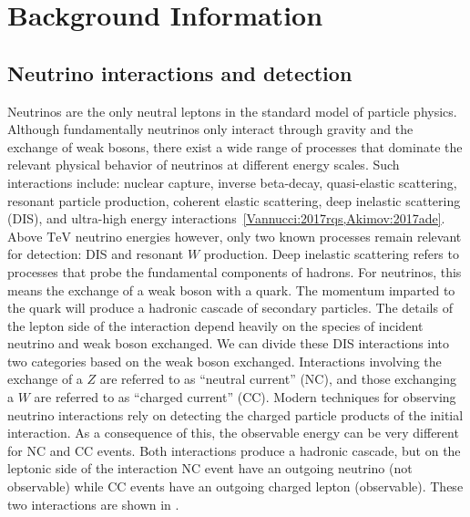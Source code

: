 \chapter{Background Information}\label{chapter:background}

\section{Neutrino interactions and detection}

Neutrinos are the only neutral leptons in the standard model of particle physics.
Although fundamentally neutrinos only interact through gravity and the exchange of weak bosons, there exist a wide range of processes that dominate the relevant physical behavior of neutrinos at different energy scales.
Such interactions include: nuclear capture, inverse beta-decay, quasi-elastic scattering, resonant particle production, coherent elastic scattering, deep inelastic scattering (DIS), and ultra-high energy interactions~\ref{Vannucci:2017rqs,Akimov:2017ade}.
Above $\si\TeV$ neutrino energies however, only two known processes remain relevant for detection: DIS and resonant $W$ production.
Deep inelastic scattering refers to processes that probe the fundamental components of hadrons.
For neutrinos, this means the exchange of a weak boson with a quark.
The momentum imparted to the quark will produce a hadronic cascade of secondary particles.
The details of the lepton side of the interaction depend heavily on the species of incident neutrino and weak boson exchanged.
We can divide these DIS interactions into two categories based on the weak boson exchanged.
Interactions involving the exchange of a $Z$ are referred to as ``neutral current'' (NC), and those exchanging a $W$ are referred to as ``charged current'' (CC).
Modern techniques for observing neutrino interactions rely on detecting the charged particle products of the initial interaction.
As a consequence of this, the observable energy can be very different for NC and CC events.
Both interactions produce a hadronic cascade, but on the leptonic side of the interaction NC event have an outgoing neutrino (not observable) while CC events have an outgoing charged lepton (observable).
These two interactions are shown in .

